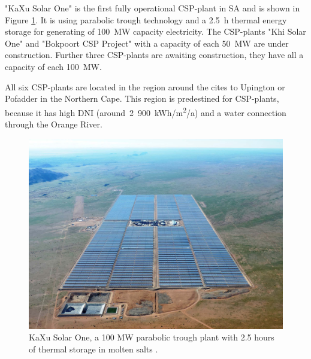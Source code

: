 "KaXu Solar One" is the first fully operational CSP-plant in SA and is shown in Figure \ref{KaXu-solar-field}. It is using parabolic trough technology and a 2.5~h thermal energy storage for generating of 100~MW capacity electricity. The CSP-plants "Khi Solar One" and "Bokpoort CSP Project" with a capacity of each 50~MW are under construction. Further three CSP-plants are awaiting construction, they have all a capacity of each 100~MW. 

All six CSP-plants are located in the region around the cites to Upington or Pofadder in the Northern Cape. This region is predestined for CSP-plants, because it has high DNI (around~2~900~kWh/m\textsuperscript{2}/a) and a water connection through the Orange River. \cite{Forder2015}
\begin{figure}[!h]
\centering
\includegraphics[width=1\linewidth]{FIG/KaXu-solar-field}
\caption[KaXu Solar One, a 100 MW parabolic trough plant with 2.5 hours of thermal storage in molten salts.]{KaXu Solar One, a 100 MW parabolic trough plant with 2.5 hours of thermal storage in molten salts \cite{AbengoaSolar2015}.}\label{KaXu-solar-field}
\end{figure}

\pagebreak
